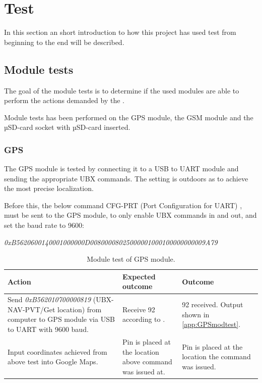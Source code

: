 
\chapter{Test}
In this section an short introduction to how this project has used test from beginning to the end will be described.

\section{Module tests}
The goal of the module tests is to determine if the used modules are able to perform the actions demanded by the .

Module tests has been performed on the \GPS GPS module, the \SARA GSM module and the \SDsock µSD-card socket with µSD-card inserted.

\subsection{GPS \GPS}
The GPS module is tested by connecting it to a USB to UART module and sending the appropriate UBX commands. The setting is outdoors as to achieve the most precise localization.

Before this, the below command CFG-PRT (Port Configuration for UART) \cite[p.~119-120]{NEO7_proto}, must be sent to the GPS module, to only enable UBX commands in and out, and set the baud rate to \num{9600}:

\noindent
\textit{0xB5620600140001000000D00800008025000001000100000000009A79}

\begin{table}[H]
	\centering
	\begin{tabularx}{\textwidth}{p{4.3cm} X X}
		\toprule
		\textbf{Action} & \textbf{Expected outcome} & \textbf{Outcome} \\
		\midrule
		Send \textit{0xB562010700000819} (UBX-NAV-PVT/Get location) from computer to GPS module via USB to UART with \num{9600} baud. & Receive \SI{92}{\byte} according to \cite[p.~160-161]{NEO7_proto}. & \SI{92}{\byte} received. Output shown in \cref{app:GPSmodtest}. \\
		\midrule
		Input coordinates achieved from above test into Google Maps. & Pin is placed at the location above command was issued at. & Pin is placed at the location the command was issued. \\
		\bottomrule
	\end{tabularx}
	\caption{Module test of \GPS GPS module.}
	\label{AT:modGPS}
\end{table}

